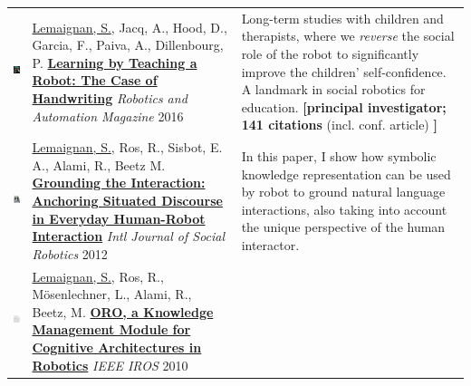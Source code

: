 \documentclass[11pt,a4paper]{report}
\begin{document}
\begin{tabular}{p{1.7cm}p{7cm}p{8cm}}
    \vspace{-.20cm}\includegraphics[height=2.2cm]{thumbs/2016-cowriter.jpg} &

    \ul{Lemaignan, S.}, Jacq, A., Hood, D., Garcia, F., Paiva, A., Dillenbourg, P.
    \newline
    \href{https://doi.org/10.1109/MRA.2016.2546700}{\textbf{Learning by
    Teaching a Robot: The Case of Handwriting}}
    \newline \textit{Robotics and Automation Magazine} 2016
    & \small Long-term studies with children and
    therapists, where we \emph{reverse} the social role of the
    robot to significantly improve the children' self-confidence. A landmark in
    social robotics for education. \textbf{\newline[principal investigator; 141
    citations} (incl. conf. article) \textbf{]}\\


    \vspace{-.20cm}\includegraphics[height=2.2cm]{thumbs/2012-grounding.jpg} &

    \ul{Lemaignan, S.}, Ros, R., Sisbot, E. A., Alami, R., Beetz M.
    \href{https://doi.org/10.1007/s12369-011-0123-x}{\textbf{Grounding
    the Interaction: Anchoring Situated Discourse in Everyday Human-Robot
    Interaction}} 
    \newline \textit{Intl Journal of Social Robotics} 2012

    & \small In this paper, I show how symbolic knowledge representation can be
    used by robot to ground natural language interactions, also taking into
    account the unique perspective of the human interactor.
    \textbf{}\\

    \vspace{-.20cm}\includegraphics[height=2.2cm]{thumbs/2010-oro.jpg} &
    \ul{Lemaignan, S.}, Ros, R., Mösenlechner, L., Alami, R., Beetz, M.
    \newline\href{https://doi.org/10.1109/IROS.2010.5649547}{\textbf{ORO, a Knowledge Management Module for Cognitive Architectures in
    Robotics}}
    \newline \textit{IEEE IROS} 2010


\end{tabular}
\end{document}
